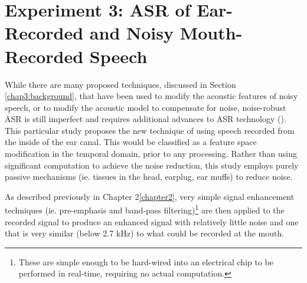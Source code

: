 \documentclass[dissertation,copyright]{uathesis}
\begin{document}
% 
% 
% 
% 
% 





\section{Experiment 3: ASR of Ear-Recorded and Noisy Mouth-Recorded Speech}\label{expt3}

While there are many proposed techniques, discussed in Section \ref{chap3:background}, that have been used to modify the acoustic features of noisy speech, or to modify the acoustic model to compensate for noise, noise-robust ASR is still imperfect and requires additional advances to ASR technology (\cite{zhang:17}).  This particular study proposes the new technique of using speech recorded from the inside of the ear canal.  This would be classified as a feature space modification in the temporal domain, prior to any processing.  Rather than using significant computation to achieve the noise reduction, this study employs purely passive mechanisms (ie. tissues in the head, earplug, ear muffs) to reduce noise.  

As described previously in Chapter 2\ref{chapter2}, very simple signal enhancement techniques (ie. pre-emphasis and band-pass filtering)\footnote{These are simple enough to be hard-wired into an electrical chip to be performed in real-time, requiring no actual computation.} are then applied to the recorded signal to produce an enhanced signal with relatively little noise and one that is very similar (below 2.7 kHz) to what could be recorded at the mouth.
\end{document}
